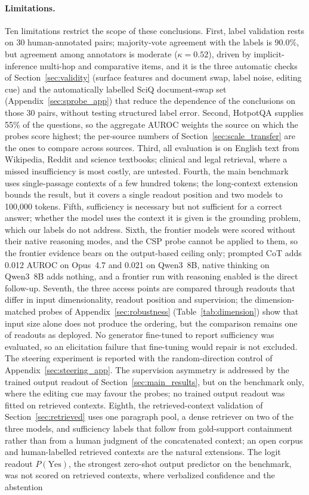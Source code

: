 \documentclass[acmsmall,screen,review]{acmart}
\begin{document}
\paragraph{Limitations.}
Ten limitations restrict the scope of these conclusions. First, label validation rests on 30 human-annotated pairs; majority-vote agreement with the labels is 90.0\%, but agreement among annotators is moderate ($\kappa = 0.52$), driven by implicit-inference multi-hop and comparative items, and it is the three automatic checks of Section~\ref{sec:validity} (surface features and document swap, label noise, editing cue) and the automatically labelled SciQ document-swap set (Appendix~\ref{sec:sprobe_app}) that reduce the dependence of the conclusions on those 30 pairs, without testing structured label error. Second, HotpotQA supplies 55\% of the questions, so the aggregate AUROC weights the source on which the probes score highest; the per-source numbers of Section~\ref{sec:scale_transfer} are the ones to compare across sources. Third, all evaluation is on English text from Wikipedia, Reddit and science textbooks; clinical and legal retrieval, where a missed insufficiency is most costly, are untested. Fourth, the main benchmark uses single-passage contexts of a few hundred tokens; the long-context extension bounds the result, but it covers a single readout position and two models to 100,000 tokens. Fifth, sufficiency is necessary but not sufficient for a correct answer; whether the model uses the context it is given is the grounding problem, which our labels do not address. Sixth, the frontier models were scored without their native reasoning modes, and the CSP probe cannot be applied to them, so the frontier evidence bears on the output-based ceiling only; prompted CoT adds 0.012 AUROC on Opus~4.7 and 0.021 on Qwen3~8B, native thinking on Qwen3~8B adds nothing, and a frontier run with reasoning enabled is the direct follow-up. Seventh, the three access points are compared through readouts that differ in input dimensionality, readout position and supervision; the dimension-matched probes of Appendix~\ref{sec:robustness} (Table~\ref{tab:dimension}) show that input size alone does not produce the ordering, but the comparison remains one of readouts as deployed. No generator fine-tuned to report sufficiency was evaluated, so an elicitation failure that fine-tuning would repair is not excluded. The steering experiment is reported with the random-direction control of Appendix~\ref{sec:steering_app}. The supervision asymmetry is addressed by the trained output readout of Section~\ref{sec:main_results}, but on the benchmark only, where the editing cue may favour the probes; no trained output readout was fitted on retrieved contexts. Eighth, the retrieved-context validation of Section~\ref{sec:retrieved} uses one paragraph pool, a dense retriever on two of the three models, and sufficiency labels that follow from gold-support containment rather than from a human judgment of the concatenated context; an open corpus and human-labelled retrieved contexts are the natural extensions. The logit readout $P(\text{Yes})$, the strongest zero-shot output predictor on the benchmark, was not scored on retrieved contexts, where verbalized confidence and the abstention 
\end{document}
